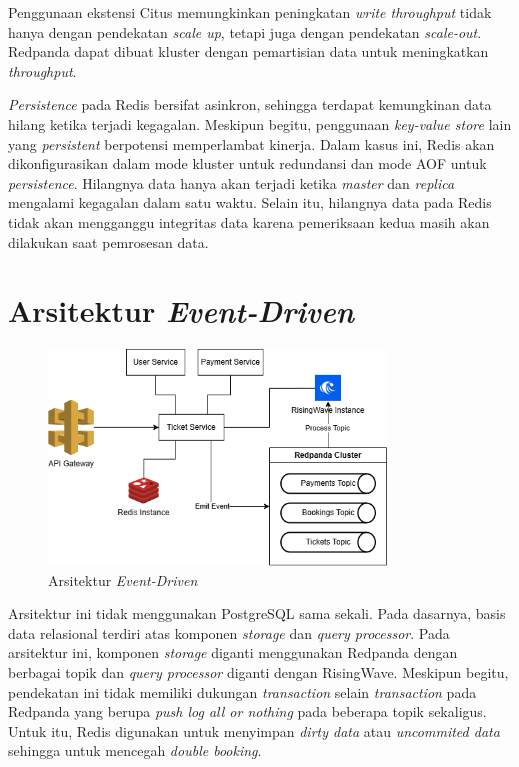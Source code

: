 Penggunaan ekstensi Citus memungkinkan peningkatan \textit{write throughput} tidak hanya dengan pendekatan \textit{scale up}, tetapi juga dengan pendekatan \textit{scale-out}. Redpanda dapat dibuat kluster dengan pemartisian data untuk meningkatkan \textit{throughput}.

\textit{Persistence} pada Redis bersifat asinkron, sehingga terdapat kemungkinan data hilang ketika terjadi kegagalan. Meskipun begitu, penggunaan \textit{key-value store} lain yang \textit{persistent} berpotensi memperlambat kinerja. Dalam kasus ini, Redis akan dikonfigurasikan dalam mode kluster untuk redundansi dan mode AOF untuk \textit{persistence}. Hilangnya data hanya akan terjadi ketika \textit{master} dan \textit{replica} mengalami kegagalan dalam satu waktu. Selain itu, hilangnya data pada Redis tidak akan mengganggu integritas data karena pemeriksaan kedua masih akan dilakukan saat pemrosesan data.

\section{Arsitektur \textit{Event-Driven}}

\begin{figure}[ht]
    \centering
    \includegraphics[width=0.8\textwidth]{resources/chapter-3/architecture-event-driven.png}
    \caption{Arsitektur \textit{Event-Driven}}
    \label{fig:solution-event-driven-architecture}
\end{figure}

Arsitektur ini tidak menggunakan PostgreSQL sama sekali. Pada dasarnya, basis data relasional terdiri atas komponen \textit{storage} dan \textit{query processor}. Pada arsitektur ini, komponen \textit{storage} diganti menggunakan Redpanda dengan berbagai topik dan \textit{query processor} diganti dengan RisingWave. Meskipun begitu, pendekatan ini tidak memiliki dukungan \textit{transaction} selain \textit{transaction} pada Redpanda yang berupa \textit{push log all or nothing} pada beberapa topik sekaligus. Untuk itu, Redis digunakan untuk menyimpan \textit{dirty data} atau \textit{uncommited data} sehingga untuk mencegah \textit{double booking}.

